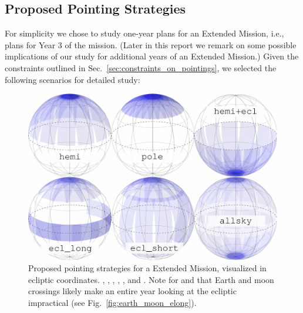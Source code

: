\subsection{Proposed Pointing Strategies}
\label{sec:proposed_pointings}

For simplicity we chose to study one-year plans for an Extended
Mission, i.e., plans for Year 3 of the \tess mission. (Later in this
report we remark on some possible implications of our study for
additional years of an Extended Mission.)  Given the constraints
outlined in Sec.~\ref{sec:constraints_on_pointings}, we selected the
following scenarios for detailed study:

\begin{figure}[!bt]
	\includegraphics{figures/proposed_pointings_flat.pdf}
	\caption{Proposed pointing strategies for a \tess Extended Mission, visualized in ecliptic coordinates. \nhemi, \npole, \shemiAvoid, \elong, \eshort, and \hemis. Note for \elong\:and \eshort\:that Earth and moon crossings likely make an entire year looking at the ecliptic impractical (see Fig.~\protect\ref{fig:earth_moon_elong}).}
	\label{fig:proposed_pointings}
\end{figure}

